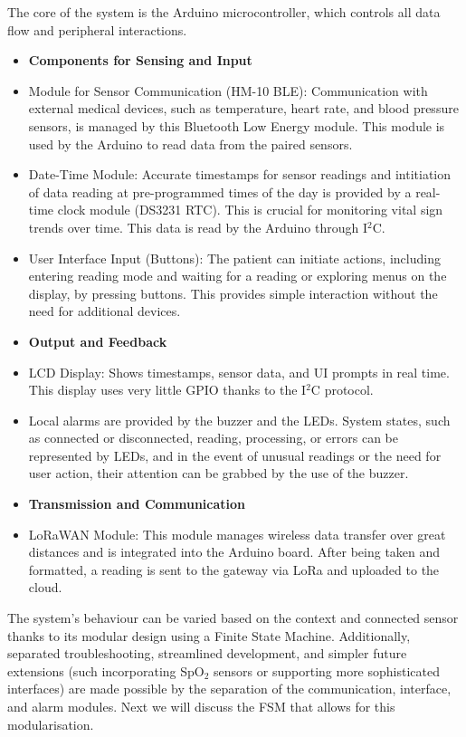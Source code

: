 The core of the system is the Arduino microcontroller, which controls all data flow and peripheral interactions.

\begin{itemize}
	\item[] \textbf{Components for Sensing and Input}
	\item Module for Sensor Communication (HM-10 BLE): Communication with external medical devices, such as temperature, heart rate, and blood pressure sensors, is managed by this Bluetooth Low Energy module. This module is used by the Arduino to read data from the paired sensors.
	\item Date-Time Module: Accurate timestamps for sensor readings and intitiation of data reading at pre-programmed times of the day is provided by a real-time clock module (DS3231 RTC). This is crucial for monitoring vital sign trends over time. This data is read by the Arduino through I$^2$C.
	\item User Interface Input (Buttons): The patient can initiate actions, including entering reading mode and waiting for a reading or exploring menus on the display, by pressing buttons. This provides simple interaction without the need for additional devices.
	\item[] \textbf{Output and Feedback} 
	\item LCD Display: Shows timestamps, sensor data, and UI prompts in real time. This display uses very little GPIO thanks to the I$^2$C protocol.
	\item Local alarms are provided by the buzzer and the LEDs. System states, such as connected or disconnected, reading, processing, or errors can be represented by LEDs, and in the event of unusual readings or the need for user action, their attention can be grabbed by the use of the buzzer.
	\item[] \textbf{Transmission and Communication}
	\item LoRaWAN Module: This module manages wireless data transfer over great distances and is integrated into the Arduino board. After being taken and formatted, a reading is sent to the gateway via LoRa and uploaded to the cloud.
\end{itemize}

The system's behaviour can be varied based on the context and connected sensor thanks to its modular design using a Finite State Machine. Additionally, separated troubleshooting, streamlined development, and simpler future extensions (such incorporating SpO$_2$ sensors or supporting more sophisticated interfaces) are made possible by the separation of the communication, interface, and alarm modules. Next we will discuss the FSM that allows for this modularisation.

